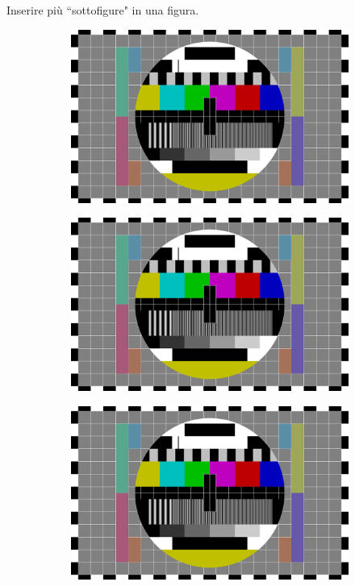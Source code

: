 Inserire più ``sottofigure" in una figura.
\begin{figure}[!h]
\centering
	\begin{subfigure}{0.35\textwidth} %
		\includegraphics[scale=0.15]{images/test.png} 
		\caption{}
	\end{subfigure}
	\begin{subfigure}{0.35\textwidth}
		\includegraphics[scale=0.15]{images/test.png}
		\caption{}
	\end{subfigure}
	\begin{subfigure}{0.35\textwidth}
		\includegraphics[scale=0.15]{images/test.png} 

\end{subfigure}
\end{figure}
